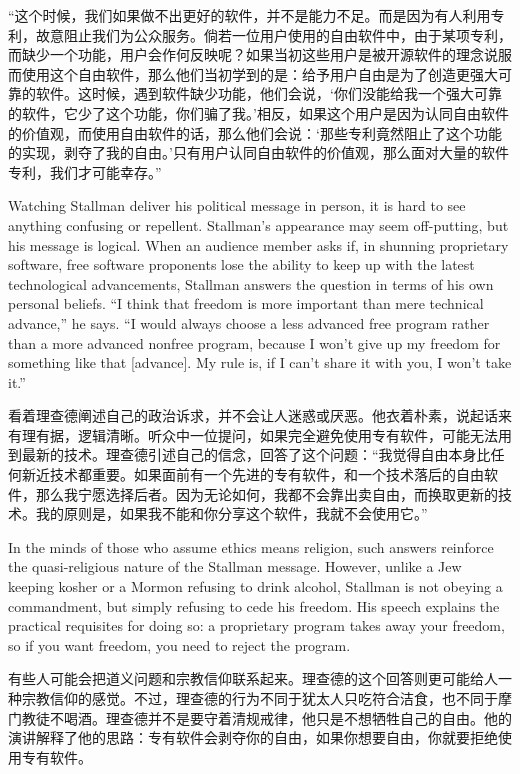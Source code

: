 \ifdefined\chs
“这个时候，我们如果做不出更好的软件，并不是能力不足。而是因为有人利用专利，故意阻止我们为公众服务。倘若一位用户使用的自由软件中，由于某项专利，而缺少一个功能，用户会作何反映呢？如果当初这些用户是被开源软件的理念说服而使用这个自由软件，那么他们当初学到的是：给予用户自由是为了创造更强大可靠的软件。这时候，遇到软件缺少功能，他们会说，‘你们没能给我一个强大可靠的软件，它少了这个功能，你们骗了我。’相反，如果这个用户是因为认同自由软件的价值观，而使用自由软件的话，那么他们会说：‘那些专利竟然阻止了这个功能的实现，剥夺了我的自由。’只有用户认同自由软件的价值观，那么面对大量的软件专利，我们才可能幸存。”
\fi

\ifdefined\eng
Watching Stallman deliver his political message in person, it is hard to see anything confusing or repellent. Stallman's appearance may seem off-putting, but his message is logical. When an audience member asks if, in shunning proprietary software, free software proponents lose the ability to keep up with the latest technological advancements, Stallman answers the question in terms of his own personal beliefs. ``I think that freedom is more important than mere technical advance,'' he says. ``I would always choose a less advanced free program rather than a more advanced nonfree program, because I won't give up my freedom for something like that [advance]. My rule is, if I can't share it with you, I won't take it.''
\fi

\ifdefined\chs
看着理查德阐述自己的政治诉求，并不会让人迷惑或厌恶。他衣着朴素，说起话来有理有据，逻辑清晰。听众中一位提问，如果完全避免使用专有软件，可能无法用到最新的技术。理查德引述自己的信念，回答了这个问题：“我觉得自由本身比任何新近技术都重要。如果面前有一个先进的专有软件，和一个技术落后的自由软件，那么我宁愿选择后者。因为无论如何，我都不会靠出卖自由，而换取更新的技术。我的原则是，如果我不能和你分享这个软件，我就不会使用它。”
\fi

\ifdefined\eng
In the minds of those who assume ethics means religion, such answers reinforce the quasi-religious nature of the Stallman message. However, unlike a Jew keeping kosher or a Mormon refusing to drink alcohol, Stallman is not obeying a commandment, but simply refusing to cede his freedom.  His speech explains the practical requisites for doing so: a proprietary program takes away your freedom, so if you want freedom, you need to reject the program.
\fi

\ifdefined\chs
有些人可能会把道义问题和宗教信仰联系起来。理查德的这个回答则更可能给人一种宗教信仰的感觉。不过，理查德的行为不同于犹太人只吃符合洁食，也不同于摩门教徒不喝酒。理查德并不是要守着清规戒律，他只是不想牺牲自己的自由。他的演讲解释了他的思路：专有软件会剥夺你的自由，如果你想要自由，你就要拒绝使用专有软件。
\fi

